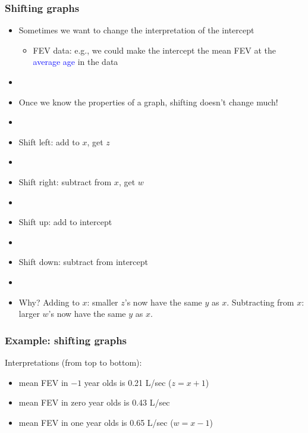 \documentclass[11pt, hyperref={colorlinks, urlcolor=blue}]{beamer}
\newcommand{\myframe}[1]{\begin{frame} \frametitle{#1}}
\newenvironment{spaceitemize}
{ \begin{itemize}
    \setlength{\itemsep}{10pt}
    \setlength{\parskip}{0pt}
    \setlength{\parsep}{0pt}     }
{ \end{itemize}                  }
\begin{document}
\myframe{Shifting graphs}
\begin{itemize}
\item Sometimes we want to change the interpretation of the intercept
\begin{itemize}
\item FEV data: e.g., we could make the intercept the mean FEV at the \textcolor{blue}{average age} in the data
\end{itemize}
\item[]
\item Once we know the properties of a graph, shifting doesn't change much!
\item[]
\item Shift left: add to $x$, get $z$
\item[]
\item Shift right: subtract from $x$, get $w$
\item[]
\item Shift up: add to intercept
\item[]
\item Shift down: subtract from intercept
\item[]
\item Why? Adding to $x$: smaller $z$'s now have the same $y$ as $x$. Subtracting from $x$: larger $w$'s now have the same $y$ as $x$.
\end{itemize}
\end{frame}

\myframe{Example: shifting graphs}
{\centering
{}
}

\scriptsize
Interpretations (from top to bottom): 
\begin{spaceitemize}
\item mean FEV in $-1$ year olds is 0.21 L/sec ($z = x+1$)
\item mean FEV in zero year olds is 0.43 L/sec
\item mean FEV in one year olds is 0.65 L/sec ($w = x-1$)
\end{spaceitemize} 
\end{frame}
\end{document}
